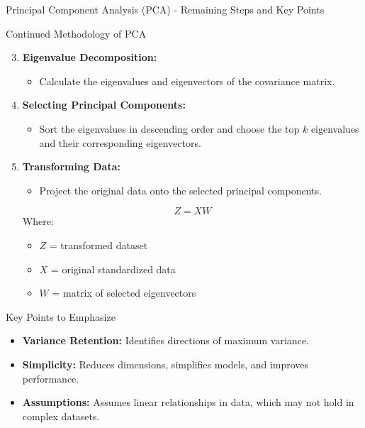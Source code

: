 \documentclass[aspectratio=169]{beamer}
\begin{document}
\begin{frame}[fragile]{Principal Component Analysis (PCA) - Remaining Steps and Key Points}
    \begin{block}{Continued Methodology of PCA}
        \begin{enumerate}[(3)]
            \setcounter{enumi}{2} %
            \item \textbf{Eigenvalue Decomposition:}
            \begin{itemize}
                \item Calculate the eigenvalues and eigenvectors of the covariance matrix.
            \end{itemize}
            
            \item \textbf{Selecting Principal Components:}
            \begin{itemize}
                \item Sort the eigenvalues in descending order and choose the top \(k\) eigenvalues and their corresponding eigenvectors.
            \end{itemize}
            
            \item \textbf{Transforming Data:}
            \begin{itemize}
                \item Project the original data onto the selected principal components.
                \end{itemize}
                \begin{equation}
                Z = XW
                \end{equation}
                Where:
                \begin{itemize}
                    \item \(Z\) = transformed dataset
                    \item \(X\) = original standardized data
                    \item \(W\) = matrix of selected eigenvectors
                \end{itemize}
        \end{enumerate}
    \end{block}

    \begin{block}{Key Points to Emphasize}
        \begin{itemize}
            \item \textbf{Variance Retention:} Identifies directions of maximum variance.
            \item \textbf{Simplicity:} Reduces dimensions, simplifies models, and improves performance.
            \item \textbf{Assumptions:} Assumes linear relationships in data, which may not hold in complex datasets.
        \end{itemize}
    \end{block}
\end{frame}
\end{document}
